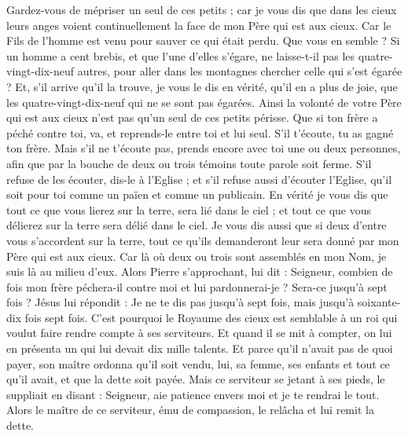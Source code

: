 \begin{multicols}{2}
Gardez-vous de mépriser un seul de ces petits ; car je vous dis que dans les cieux leurs anges voient continuellement la face de mon Père qui est aux cieux.
Car le Fils de l'homme est venu pour sauver ce qui était perdu.
Que vous en semble ? Si un homme a cent brebis, et que l'une d'elles s'égare, ne laisse-t-il pas les quatre-vingt-dix-neuf autres, pour aller dans les montagnes chercher celle qui s'est égarée ?
Et, s'il arrive qu'il la trouve, je vous le dis en vérité, qu'il en a plus de joie, que les quatre-vingt-dix-neuf qui ne se sont pas égarées.
Ainsi la volonté de votre Père qui est aux cieux n'est pas qu'un seul de ces petits périsse.
Que si ton frère a péché contre toi, va, et reprends-le entre toi et lui seul. S'il t'écoute, tu as gagné ton frère.
Mais s'il ne t'écoute pas, prends encore avec toi une ou deux personnes, afin que par la bouche de deux ou trois témoins toute parole soit ferme.
S'il refuse de les écouter, dis-le à l'Eglise ; et s'il refuse aussi d'écouter l'Eglise, qu'il soit pour toi comme un païen et comme un publicain.
En vérité je vous dis que tout ce que vous lierez sur la terre, sera lié dans le ciel ; et tout ce que vous délierez sur la terre sera délié dans le ciel.
Je vous dis aussi que si deux d'entre vous s'accordent sur la terre, tout ce qu'ils demanderont leur sera donné par mon Père qui est aux cieux.
Car là où deux ou trois sont assemblés en mon Nom, je suis là au milieu d'eux.
Alors Pierre s'approchant, lui dit : Seigneur, combien de fois mon frère péchera-il contre moi et lui pardonnerai-je ? Sera-ce jusqu'à sept fois ?
Jésus lui répondit : Je ne te dis pas jusqu'à sept fois, mais jusqu'à soixante-dix fois sept fois.
C'est pourquoi le Royaume des cieux est semblable à un roi qui voulut faire rendre compte à ses serviteurs.
Et quand il se mit à compter, on lui en présenta un qui lui devait dix mille talents.
Et parce qu'il n'avait pas de quoi payer, son maître ordonna qu'il soit vendu, lui, sa femme, ses enfants et tout ce qu'il avait, et que la dette soit payée.
Mais ce serviteur se jetant à ses pieds, le suppliait en disant : Seigneur, aie patience envers moi et je te rendrai le tout.
Alors le maître de ce serviteur, ému de compassion, le relâcha et lui remit la dette.

\end{multicols}
